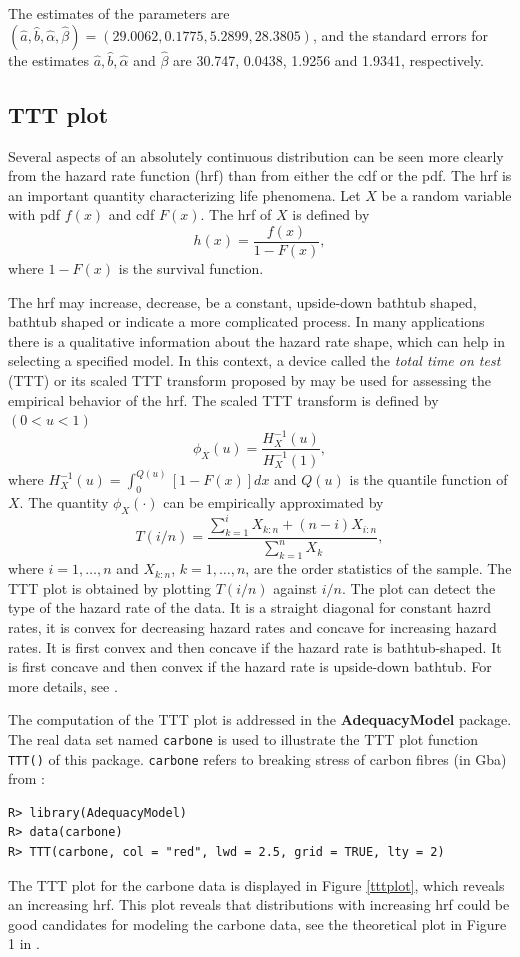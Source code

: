 \documentclass[10pt,letterpaper]{article}
\begin{document}
The estimates of the parameters are
$(\widehat{a},\widehat{b},\widehat{\alpha},\widehat{\beta}) = (29.0062, 0.1775, 5.2899, 28.3805)$, and
the standard errors for the estimates $\widehat{a}, \widehat{b}, \widehat{\alpha}$ and $\widehat{\beta}$
are 30.747, 0.0438, 1.9256 and 1.9341, respectively.


\subsection{TTT plot}

Several aspects of an absolutely continuous distribution can be seen more clearly from the hazard rate function (hrf) than from either the cdf or the pdf.
The hrf is an important quantity characterizing life phenomena.
Let $X$ be a random variable with pdf $f(x)$ and cdf $F(x)$.
The hrf of $X$ is defined by
\begin{equation*}
h(x) = \frac{f(x)}{1-F(x)},
\end{equation*}
where $1 - F(x)$ is the survival function.

The hrf may  increase, decrease, be a constant, upside-down bathtub shaped, bathtub shaped or indicate a more complicated process.
In many applications there is a qualitative information about the hazard rate shape,
which can help in selecting a specified model.
In this context, a device called the {\it total time on test} (TTT) or its scaled TTT transform proposed by \cite{aarset1987} may be used for
assessing the empirical behavior of the hrf.
The scaled TTT transform is defined by $(0 < u < 1)$ $$\phi_X(u) = \frac{H^{-1}_{X}(u)}{H^{-1}_{X}(1)},$$
where $H^{-1}_{X}(u) = \int_{0}^{Q(u)}[1-F(x)]dx$ and $Q(u)$ is the quantile function of $X$.
The quantity $\phi_X(\cdot)$ can be empirically approximated by
$$T(i/n) = \frac{\sum_{k=1}^i X_{k:n} + (n - i)X_{i:n}}{\sum_{k=1}^n X_{k}},$$
where $i = 1, \ldots, n$ and $X_{k:n}$, $k=1,\ldots,n$, are the order statistics of the sample.
The TTT plot is obtained by plotting $T(i/n)$ against $i/n$.
The plot can detect the type of the hazard rate of the data.
It is a straight diagonal for constant hazrd rates,
it is convex for decreasing hazard rates and concave for increasing hazard rates.
It is first convex and then concave if the hazard rate is bathtub-shaped.
It is first concave and then convex if the hazard rate is upside-down bathtub.
For more details, see \cite{aarset1987}.

The computation of the TTT plot is addressed in the \textbf{AdequacyModel} package.
The real data set named \texttt{carbone} is used to illustrate
the TTT plot function \texttt{TTT()} of this package.
\texttt{carbone} refers to breaking stress of carbon fibres (in Gba) from \cite{nicholspadgett2006}:
\begin{verbatim}
R> library(AdequacyModel)
R> data(carbone)
R> TTT(carbone, col = "red", lwd = 2.5, grid = TRUE, lty = 2)
\end{verbatim}
The TTT plot for the carbone data \cite{nicholspadgett2006} is displayed in Figure \ref{tttplot}, which reveals an increasing hrf.
This plot reveals that distributions with increasing hrf could be good candidates for modeling the carbone data, see the theoretical
plot in Figure 1 in \cite{aarset1987}.
\end{document}
